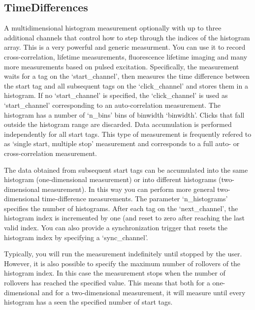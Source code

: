 \documentclass[letterpaper,10pt,english]{sphinxmanual}
\begin{document}
\subsection{TimeDifferences}
\label{sections/api:timedifferences}
A multidimensional histogram measurement optionally with up to three additional channels that control how to
step through the indices of the histogram array. This is a very powerful and generic measurment.
You can use it to record cross-correlation, lifetime measurements, fluorescence lifetime imaging
and many more measurements based on pulsed excitation.
Specifically, the measurement waits for a tag on the `start\_channel', then measures the
time difference between the start tag and all subsequent tags on the `click\_channel'
and stores them in a histogram. If no `start\_channel' is specified, the `click\_channel' is used as `start\_channel'
corresponding to an auto-correlation measurement.
The histogram has a number of `n\_bins' bins of binwidth `binwidth'. Clicks that fall outside the histogram range are discarded.
Data accumulation is performed independently for all start tags. This type of measurement is frequently refered to as
`single start, multiple stop' measurement and corresponds to a full auto- or cross-correlation measurement.

The data obtained from subsequent start tags can be accumulated into the same histogram (one-dimensional measurement)
or into different histograms (two-dimensional measurement). In this way you can perform more general two-dimensional
time-difference measurements. The parameter `n\_histograms' specifies the number of histograms. After each tag
on the `next\_channel', the histogram index is incremented by one (and reset to zero after reaching the last valid index.
You can also provide a synchronization trigger that resets the histogram index by
specifying a `sync\_channel'.

Typically, you will run the measurement indefinitely until stopped by the user. However, it is also possible to
specify the maximum number of rollovers of the histogram index. In this case the measurement stops when the number of
rollovers has reached the specified value. This means that both for a one-dimensional and for a
two-dimensional measurement, it will measure until every histogram has a seen the specified number of start tags.
\end{document}
